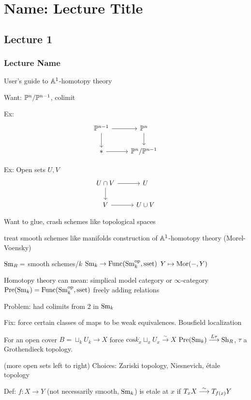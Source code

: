 \newpage
\section{Name: Lecture Title}
\subsection{Lecture 1}
\subsubsection{Lecture Name}


User's guide to $\A^1$-homotopy theory

Want: $\P^n/\P^{n-1}$, colimit

Ex:
	\[
	\begin{tikzcd}
	\P^{n-1} \arrow{r} \arrow{d} & \P^n \arrow{d} \\
	* \arrow{r} & \P^n/\P^{n-1}
	\end{tikzcd}
	\]

Ex: Open sets $U,V$
	\[
	\begin{tikzcd}
	U \cap V \arrow{r} \arrow{d} & U \\
	V \arrow{r} & U \cup V
	\end{tikzcd}
	\]

Want to glue, crash schemes like topological spaces

treat smooth schemes like manifolds
construction of $\A^1$-homotopy theory (Morel-Voensky)

$\sm_R=$ smooth schemes/$k$
$\sm_k \to \func(\sm_k^\text{op}, \text{sset})$
$Y \mapsto \mor(-,Y)$


Homotopy theory can mean: simplical model category or $\infty$-category
$\pre(\sm_k)= \func(\sm_k^\text{op}, \text{sset})$ freely adding relations

Problem: had colimits from 2 in $\sm_k$

Fix: force certain classes of maps to be weak equivalences. Bousfield localization

For an open cover $B= \sqcup_k U_k \to X$
force $\text{cos}k_x^\cdot \sqcup_x U_x \stackrel{\sim}{\to} X$
$\pre(\sm_k) \ma{L\tau} \sh_R$, $\tau$ a Grothendieck topology. 


(more open sets left to right)
Choices: Zariski topology, Niesnevich, \'etale topology



Def: $f: X \to Y$ (not necessarily smooth, $\sm_k$)
is etale at $x$ if $T_x X \ma{\sim} T_{f(x)} Y$


